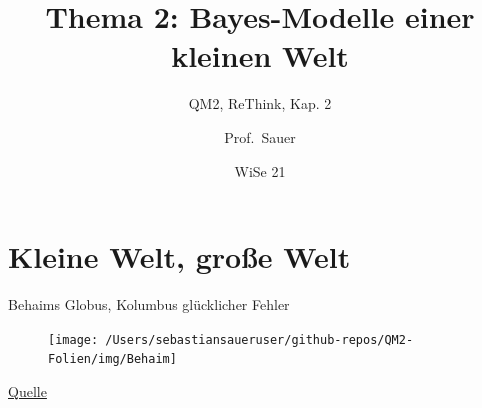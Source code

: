\documentclass[
  ngerman,
  ignorenonframetext,
]{beamer}
\title{Thema 2: Bayes-Modelle einer kleinen Welt}
\subtitle{QM2, ReThink, Kap. 2}
\author{Prof.~Sauer}
\date{WiSe 21}
\institute{AWM, HS Ansbach}
\begin{document}
\frame{\titlepage}

\begin{frame}[allowframebreaks]
  \tableofcontents[hideallsubsections]
\end{frame}
\hypertarget{kleine-welt-grouxdfe-welt}{%
\section{Kleine Welt, große Welt}\label{kleine-welt-grouxdfe-welt}}

\begin{frame}{Behaims Globus, Kolumbus glücklicher Fehler}
\protect\hypertarget{behaims-globus-kolumbus-gluxfccklicher-fehler}{}
\begin{figure}[H]
\texttt{[image: /Users/sebastiansaueruser/github-repos/QM2-Folien/img/Behaim]} \end{figure}

\href{https://de.wikipedia.org/wiki/Martin_Behaims_Erdapfel\#/media/Datei:RavensteinBehaim.jpg}{Quelle}
\end{frame}
\end{document}
